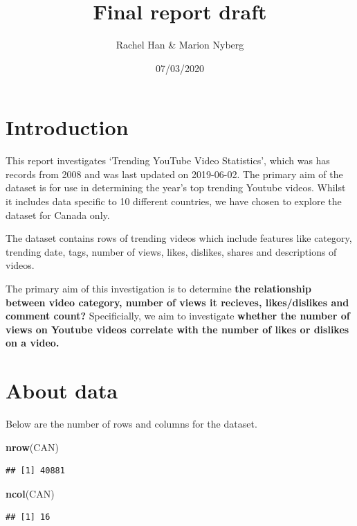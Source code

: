 \documentclass[]{article}
\title{Final report draft}
\author{Rachel Han \& Marion Nyberg}
\date{07/03/2020}
\newenvironment{Shaded}{\begin{snugshade}}{\end{snugshade}}
\newcommand{\KeywordTok}[1]{\textcolor[rgb]{0.13,0.29,0.53}{\textbf{#1}}}
\newcommand{\NormalTok}[1]{#1}
\begin{document}
\maketitle

\hypertarget{introduction}{%
\section{Introduction}\label{introduction}}

This report investigates `Trending YouTube Video Statistics', which was
has records from 2008 and was last updated on 2019-06-02. The primary
aim of the dataset is for use in determining the year's top trending
Youtube videos. Whilst it includes data specific to 10 different
countries, we have chosen to explore the dataset for Canada only.

The dataset contains rows of trending videos which include features like
category, trending date, tags, number of views, likes, dislikes, shares
and descriptions of videos.

The primary aim of this investigation is to determine \textbf{the
relationship between video category, number of views it recieves,
likes/dislikes and comment count?} Specificially, we aim to investigate
\textbf{whether the number of views on Youtube videos correlate with the
number of likes or dislikes on a video.}

\hypertarget{about-data}{%
\section{About data}\label{about-data}}

Below are the number of rows and columns for the dataset.

\begin{Shaded}
\begin{Highlighting}[]
\KeywordTok{nrow}\NormalTok{(CAN) }
\end{Highlighting}
\end{Shaded}

\begin{verbatim}
## [1] 40881
\end{verbatim}

\begin{Shaded}
\begin{Highlighting}[]
\KeywordTok{ncol}\NormalTok{(CAN)}
\end{Highlighting}
\end{Shaded}

\begin{verbatim}
## [1] 16
\end{verbatim}
\end{document}
